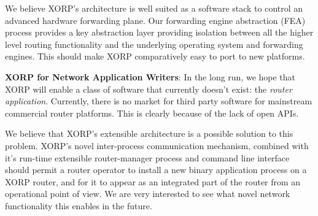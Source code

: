 We believe XORP's architecture is well suited as a software stack to
control an advanced hardware forwarding plane.  Our forwarding engine
abstraction (FEA) process provides a key abstraction layer providing
isolation between all the higher level routing functionality and the
underlying operating system and forwarding engines.  This should make
XORP comparatively easy to port to new platforms.

\vspace{0.1in}\noindent\textbf{XORP for Network Application Writers}:
In the long run, we hope that XORP will enable a class of software
that currently doesn't exist: the \textit{router application}.  Currently,
there is no market for third party software for mainstream commercial
router platforms.  This is clearly because of the lack of open APIs.

We believe that XORP's extensible architecture is a possible solution
to this problem.  XORP's novel inter-process communication mechanism,
combined with it's run-time extensible router-manager process and
command line interface should permit a router operator to install a
new binary application process on a XORP router, and for it to appear
as an integrated part of the router from an operational point of view.
We are very interested to see what novel network functionality this
enables in the future.
